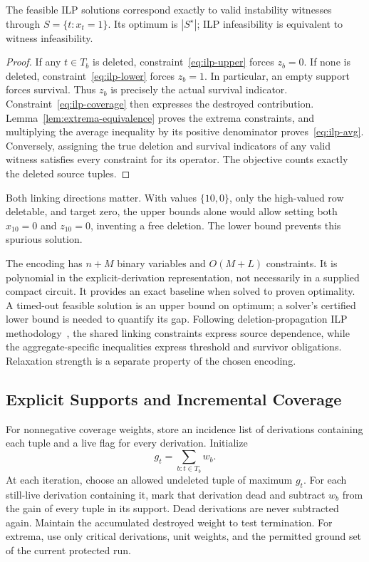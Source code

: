 \begin{theorem}
\label{thm:ilp}
The feasible ILP solutions correspond exactly to valid instability
witnesses through $S=\{t:x_t=1\}$. Its optimum is $|S^\star|$;
ILP infeasibility is equivalent to witness infeasibility.
\end{theorem}
\begin{proof}
If any $t\in T_b$ is deleted, constraint~\eqref{eq:ilp-upper} forces
$z_b=0$. If none is deleted, constraint~\eqref{eq:ilp-lower} forces
$z_b=1$. In particular, an empty support forces survival. Thus $z_b$
is precisely the actual survival indicator. Constraint~\eqref{eq:ilp-coverage}
then expresses the destroyed contribution. Lemma~\ref{lem:extrema-equivalence}
proves the extrema constraints, and multiplying the average inequality
by its positive denominator proves~\eqref{eq:ilp-avg}. Conversely,
assigning the true deletion and survival indicators of any valid witness
satisfies every constraint for its operator. The objective counts exactly
the deleted source tuples.
\end{proof}

Both linking directions matter. With values $\{10,0\}$, only the
high-valued row deletable, and target zero, the upper bounds alone would
allow setting both $x_{10}=0$ and $z_{10}=0$, inventing a free deletion.
The lower bound prevents this spurious solution.

The encoding has $n+M$ binary variables and $O(M+L)$ constraints.
It is polynomial in the explicit-derivation representation, not necessarily
in a supplied compact circuit. It provides an exact baseline when solved
to proven optimality. A timed-out feasible solution is an upper bound on
optimum; a solver's certified lower bound is needed to quantify its gap.
Following deletion-propagation ILP methodology~\cite{makhija2025ilp},
the shared linking constraints express source dependence, while the
aggregate-specific inequalities express threshold and survivor obligations.
Relaxation strength is a separate property of the chosen encoding.

\subsection{Explicit Supports and Incremental Coverage}
\label{sec:explicit-greedy}

For nonnegative coverage weights, store an incidence list of derivations
containing each tuple and a live flag for every derivation. Initialize
\[
g_t=\sum_{b:t\in T_b}w_b.
\]
At each iteration, choose an allowed undeleted tuple of maximum $g_t$.
For each still-live derivation containing it, mark that derivation dead
and subtract $w_b$ from the gain of every tuple in its support. Dead
derivations are never subtracted again. Maintain the accumulated destroyed
weight to test termination. For extrema, use only critical derivations,
unit weights, and the permitted ground set of the current protected run.

